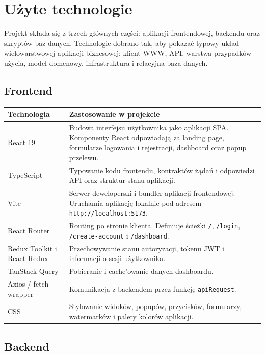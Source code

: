 \documentclass[12pt,a4paper]{article}
\begin{document}
\section{Użyte technologie}

Projekt składa się z trzech głównych części: aplikacji frontendowej, backendu oraz skryptów baz danych. Technologie dobrano tak, aby pokazać typowy układ wielowarstwowej aplikacji biznesowej: klient WWW, API, warstwa przypadków użycia, model domenowy, infrastruktura i relacyjna baza danych.

\subsection{Frontend}

\begin{longtable}{p{}p{}}
\toprule
\textbf{Technologia} & \textbf{Zastosowanie w projekcie} \\
\midrule
\endhead
React 19 & Budowa interfejsu użytkownika jako aplikacji SPA. Komponenty React odpowiadają za landing page, formularze logowania i rejestracji, dashboard oraz popup przelewu. \\
TypeScript & Typowanie kodu frontendu, kontraktów żądań i odpowiedzi API oraz struktur stanu aplikacji. \\
Vite & Serwer deweloperski i bundler aplikacji frontendowej. Uruchamia aplikację lokalnie pod adresem \texttt{http://localhost:5173}. \\
React Router & Routing po stronie klienta. Definiuje ścieżki \texttt{/}, \texttt{/login}, \texttt{/create-account} i \texttt{/dashboard}. \\
Redux Toolkit i React Redux & Przechowywanie stanu autoryzacji, tokenu JWT i informacji o sesji użytkownika. \\
TanStack Query & Pobieranie i cache'owanie danych dashboardu. \\
Axios / fetch wrapper & Komunikacja z backendem przez funkcję \texttt{apiRequest}. \\
CSS & Stylowanie widoków, popupów, przycisków, formularzy, watermarków i palety kolorów aplikacji. \\
\bottomrule
\end{longtable}

\subsection{Backend}
\end{document}
